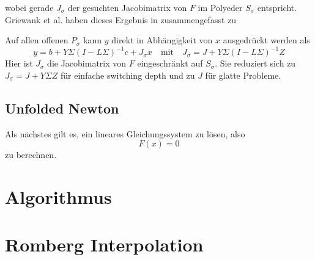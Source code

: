 wobei gerade $J_\sigma$ der gesuchten Jacobimatrix von $F$ im Polyeder $S_\sigma$ entspricht. 
Griewank et al. haben dieses Ergebnis in \cite[Proposition 2.2]{plan} zusammengefasst zu  
\begin{theorem}
Auf allen offenen $P_\sigma$ kann $y$ direkt in Abhängigkeit von $x$ ausgedrückt werden als
\begin{equation}
y = b+Y\Sigma(I-L\Sigma)^{-1}c + J_\sigma x  \quad \text{mit} \quad J_\sigma = J+Y\Sigma(I-L\Sigma)^{-1} Z
\label{eq:explJacRepresentation}
\end{equation}
Hier ist $J_\sigma$ die Jacobimatrix von $F$ eingeschränkt auf $S_\sigma$. Sie reduziert sich zu $J_\sigma=J+Y\Sigma Z$ für einfache switching depth und zu $J$ für glatte Probleme.
\end{theorem}
\subsection{Unfolded Newton}
Als nächstes gilt es, ein lineares Gleichungssystem zu lösen, also 
\[
 F(x) = 0
\]
zu berechnen. 


\section{Algorithmus}

\section{Romberg Interpolation}
\cite{boeck14}
